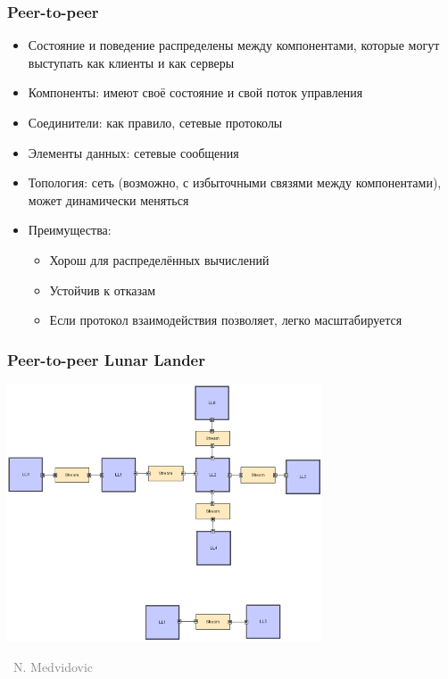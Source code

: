 \documentclass[xetex,mathserif,serif]{beamer}
\newcommand{\attribution}[1] {
    \vspace{-5mm}\begin{flushright}\begin{scriptsize}\textcolor{gray}{\textcopyright\, #1}\end{scriptsize}\end{flushright}
}
\begin{document}
    \begin{frame}
        \frametitle{Peer-to-peer}
        \begin{itemize}
            \item Состояние и поведение распределены между компонентами, которые могут выступать как клиенты и как серверы
            \item Компоненты: имеют своё состояние и свой поток управления
            \item Соединители: как правило, сетевые протоколы
            \item Элементы данных: сетевые сообщения
            \item Топология: сеть (возможно, с избыточными связями между компонентами), может динамически меняться
            \item Преимущества:
            \begin{itemize}
                \item Хорош для распределённых вычислений
                \item Устойчив к отказам
                \item Если протокол взаимодействия позволяет, легко масштабируется
            \end{itemize}
        \end{itemize}
    \end{frame}

    \begin{frame}
        \frametitle{Peer-to-peer Lunar Lander}
        \begin{center}
            \includegraphics[width=0.7\textwidth]{peerToPeerLL.png}
            \attribution{N. Medvidovic}
        \end{center}
    \end{frame}
\end{document}
